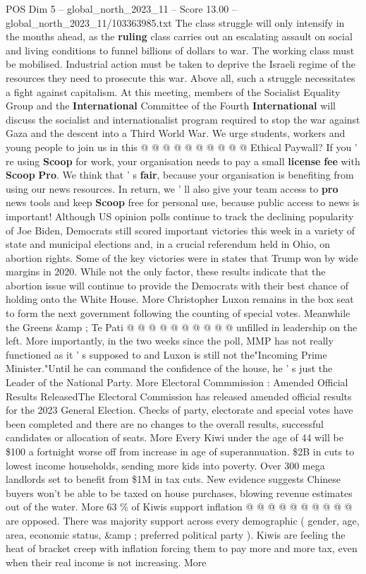 \begin{textsample}{POS Dim 5 – global\_north\_2023\_11 – Score 13.00 – global\_north\_2023\_11/103363985.txt}
The class struggle will only intensify in the months ahead, as the \textbf{ruling} class carries out an escalating assault on social and living conditions to funnel billions of dollars to war.
The working class must be mobilised.
Industrial action must be taken to deprive the Israeli regime of the resources they need to prosecute this war.
Above all, such a struggle necessitates a fight against capitalism.
At this meeting, members of the Socialist Equality Group and the \textbf{International} Committee of the Fourth \textbf{International} will discuss the socialist and internationalist program required to stop the war against Gaza and the descent into a Third World War.
We urge students, workers and young people to join us in this @ @ @ @ @ @ @ @ @ @ Ethical Paywall?
If you ' re using \textbf{Scoop} for work, your organisation needs to pay a small \textbf{license} \textbf{fee} with \textbf{Scoop} \textbf{Pro}.
We think that ' s \textbf{fair}, because your organisation is benefiting from using our news resources.
In return, we ' ll also give your team access to \textbf{pro} news tools and keep \textbf{Scoop} free for personal use, because public access to news is important!
Although US opinion polls continue to track the declining popularity of Joe Biden, Democrats still scored important victories this week in a variety of state and municipal elections and, in a crucial referendum held in Ohio, on abortion rights.
Some of the key victories were in states that Trump won by wide margins in 2020.
While not the only factor, these results indicate that the abortion issue will continue to provide the Democrats with their best chance of holding onto the White House.
More Christopher Luxon remains in the box seat to form the next government following the counting of special votes.
Meanwhile the Greens \&amp ; Te Pati @ @ @ @ @ @ @ @ @ @ unfilled in leadership on the left.
More importantly, in the two weeks since the poll, MMP has not really functioned as it ' s supposed to and Luxon is still not the"Incoming Prime Minister."Until he can command the confidence of the house, he ' s just the Leader of the National Party.
More Electoral Commmission : Amended Official Results ReleasedThe Electoral Commission has released amended official results for the 2023 General Election.
Checks of party, electorate and special votes have been completed and there are no changes to the overall results, successful candidates or allocation of seats.
More Every Kiwi under the age of 44 will be \$100 a fortnight worse off from increase in age of superannuation. \$2B in cuts to lowest income households, sending more kids into poverty.
Over 300 mega landlords set to benefit from \$1M in tax cuts.
New evidence suggests Chinese buyers won't be able to be taxed on house purchases, blowing revenue estimates out of the water.
More 63 \% of Kiwis support inflation @ @ @ @ @ @ @ @ @ @ are opposed.
There was majority support across every demographic ( gender, age, area, economic status, \&amp ; preferred political party ).
Kiwis are feeling the heat of bracket creep with inflation forcing them to pay more and more tax, even when their real income is not increasing.
More


\end{textsample}
